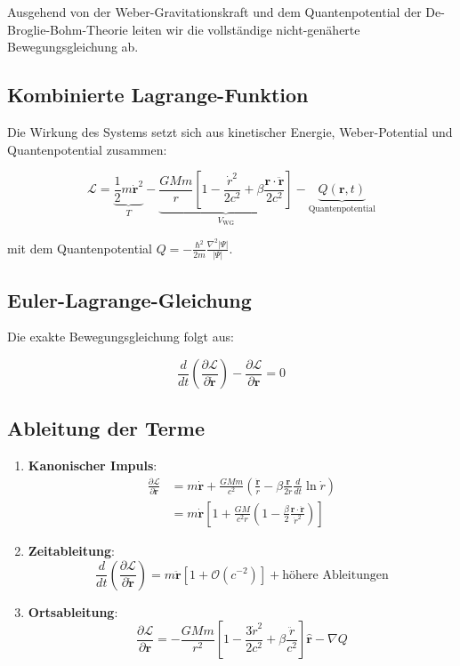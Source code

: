 Ausgehend von der Weber-Gravitationskraft und dem Quantenpotential der De-Broglie-Bohm-Theorie leiten wir die vollständige nicht-genäherte Bewegungsgleichung ab.

\subsection{Kombinierte Lagrange-Funktion}
Die Wirkung des Systems setzt sich aus kinetischer Energie, Weber-Potential und Quantenpotential zusammen:

\begin{equation}
\mathcal{L} = \underbrace{\frac{1}{2}m\dot{\mathbf{r}}^2}_{T} - \underbrace{\frac{GMm}{r}\left[1 - \frac{\dot{r}^2}{2c^2} + \beta\frac{\mathbf{r}\cdot\ddot{\mathbf{r}}}{2c^2}\right]}_{V_{\text{WG}}} - \underbrace{Q(\mathbf{r},t)}_{\text{Quantenpotential}}
\end{equation}

mit dem Quantenpotential $Q = -\frac{\hbar^2}{2m}\frac{\nabla^2|\Psi|}{|\Psi|}$.

\subsection{Euler-Lagrange-Gleichung}
Die exakte Bewegungsgleichung folgt aus:

\begin{equation}
\frac{d}{dt}\left(\frac{\partial\mathcal{L}}{\partial\dot{\mathbf{r}}}\right) - \frac{\partial\mathcal{L}}{\partial\mathbf{r}} = 0
\end{equation}

\subsection{Ableitung der Terme}
\begin{enumerate}
\item \textbf{Kanonischer Impuls}:
\begin{align}
\frac{\partial\mathcal{L}}{\partial\dot{\mathbf{r}}} &= m\dot{\mathbf{r}} + \frac{GMm}{c^2}\left(\frac{\dot{\mathbf{r}}}{r} - \beta\frac{\mathbf{r}}{2r}\frac{d}{dt}\ln\dot{r}\right) \\
&= m\dot{\mathbf{r}}\left[1 + \frac{GM}{c^2r}\left(1 - \frac{\beta}{2}\frac{\mathbf{r}\cdot\ddot{\mathbf{r}}}{\dot{r}^2}\right)\right]
\end{align}

\item \textbf{Zeitableitung}:
\begin{equation}
\frac{d}{dt}\left(\frac{\partial\mathcal{L}}{\partial\dot{\mathbf{r}}}\right) = m\ddot{\mathbf{r}}\left[1 + \mathcal{O}(c^{-2})\right] + \text{höhere Ableitungen}
\end{equation}

\item \textbf{Ortsableitung}:
\begin{equation}
\frac{\partial\mathcal{L}}{\partial\mathbf{r}} = -\frac{GMm}{r^2}\left[1 - \frac{3\dot{r}^2}{2c^2} + \beta\frac{\ddot{r}}{c^2}\right]\hat{\mathbf{r}} - \nabla Q
\end{equation}
\end{enumerate}

